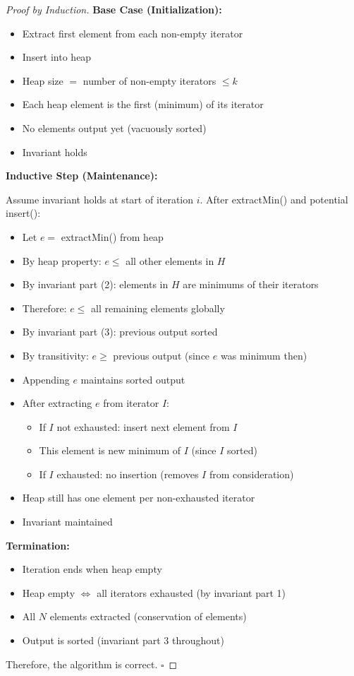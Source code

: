 \documentclass[11pt]{article}
\begin{document}
\begin{proof}[Proof by Induction]
\textbf{Base Case (Initialization):}
\begin{itemize}
    \item Extract first element from each non-empty iterator
    \item Insert into heap
    \item Heap size $= $ number of non-empty iterators $\leq k$
    \item Each heap element is the first (minimum) of its iterator
    \item No elements output yet (vacuously sorted)
    \item Invariant holds \checkmark
\end{itemize}

\textbf{Inductive Step (Maintenance):}

Assume invariant holds at start of iteration $i$. After extractMin() and potential insert():

\begin{itemize}
    \item Let $e = $ extractMin() from heap
    \item By heap property: $e \leq $ all other elements in $H$
    \item By invariant part (2): elements in $H$ are minimums of their iterators
    \item Therefore: $e \leq $ all remaining elements globally
    \item By invariant part (3): previous output sorted
    \item By transitivity: $e \geq $ previous output (since $e$ was minimum then)
    \item Appending $e$ maintains sorted output \checkmark

    \item After extracting $e$ from iterator $I$:
    \begin{itemize}
        \item If $I$ not exhausted: insert next element from $I$
        \item This element is new minimum of $I$ (since $I$ sorted)
        \item If $I$ exhausted: no insertion (removes $I$ from consideration)
    \end{itemize}
    \item Heap still has one element per non-exhausted iterator \checkmark
    \item Invariant maintained
\end{itemize}

\textbf{Termination:}
\begin{itemize}
    \item Iteration ends when heap empty
    \item Heap empty $\Leftrightarrow$ all iterators exhausted (by invariant part 1)
    \item All $N$ elements extracted (conservation of elements)
    \item Output is sorted (invariant part 3 throughout)
\end{itemize}

Therefore, the algorithm is correct. $\square$
\end{proof}
\end{document}
